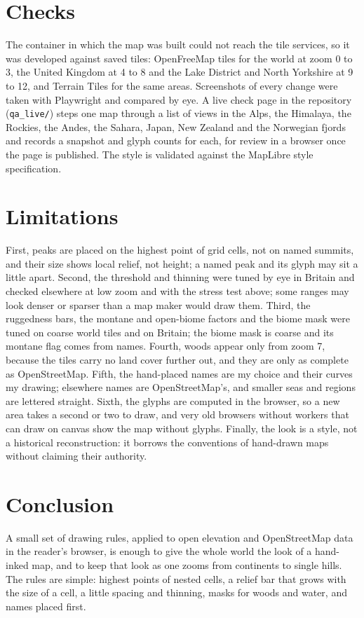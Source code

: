 \documentclass[11pt,a4paper]{article}
\begin{document}
\section{Checks}
The container in which the map was built could not reach the tile services, so it was developed against saved tiles: OpenFreeMap tiles for the world at zoom 0 to 3, the United Kingdom at 4 to 8 and the Lake District and North Yorkshire at 9 to 12, and Terrain Tiles for the same areas. Screenshots of every change were taken with Playwright and compared by eye. A live check page in the repository (\texttt{qa\_live/}) steps one map through a list of views in the Alps, the Himalaya, the Rockies, the Andes, the Sahara, Japan, New Zealand and the Norwegian fjords and records a snapshot and glyph counts for each, for review in a browser once the page is published. The style is validated against the MapLibre style specification.

\section{Limitations}
First, peaks are placed on the highest point of grid cells, not on named summits, and their size shows local relief, not height; a named peak and its glyph may sit a little apart. Second, the threshold and thinning were tuned by eye in Britain and checked elsewhere at low zoom and with the stress test above; some ranges may look denser or sparser than a map maker would draw them. Third, the ruggedness bars, the montane and open-biome factors and the biome mask were tuned on coarse world tiles and on Britain; the biome mask is coarse and its montane flag comes from names. Fourth, woods appear only from zoom 7, because the tiles carry no land cover further out, and they are only as complete as OpenStreetMap. Fifth, the hand-placed names are my choice and their curves my drawing; elsewhere names are OpenStreetMap's, and smaller seas and regions are lettered straight. Sixth, the glyphs are computed in the browser, so a new area takes a second or two to draw, and very old browsers without workers that can draw on canvas show the map without glyphs. Finally, the look is a style, not a historical reconstruction: it borrows the conventions of hand-drawn maps without claiming their authority.

\section{Conclusion}
A small set of drawing rules, applied to open elevation and OpenStreetMap data in the reader's browser, is enough to give the whole world the look of a hand-inked map, and to keep that look as one zooms from continents to single hills. The rules are simple: highest points of nested cells, a relief bar that grows with the size of a cell, a little spacing and thinning, masks for woods and water, and names placed first.
\end{document}
